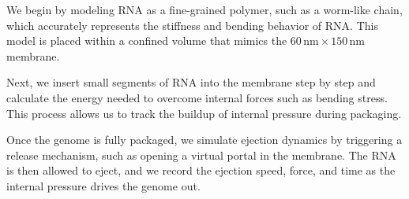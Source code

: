 \documentclass[12pt]{article}
\begin{document}
\begin{flushleft}

	
	
		





We begin by modeling RNA as a fine-grained polymer, such as a worm-like chain, which accurately represents the stiffness and bending behavior of RNA. This model is placed within a confined volume that mimics the $60\,\text{nm} \times 150\,\text{nm}$ membrane\cite{Grayson2006}.

 
Next, we insert small segments of RNA into the membrane step by step and calculate the energy needed to overcome internal forces such as  bending stress. This process allows us to track the buildup of internal pressure during packaging.



Once the genome is fully packaged, we simulate ejection dynamics by triggering a release mechanism, such as opening a virtual portal in the membrane. The RNA is then allowed to eject, and we record the ejection speed, force, and time as the internal pressure drives the genome out.


\end{flushleft}
\end{document}
